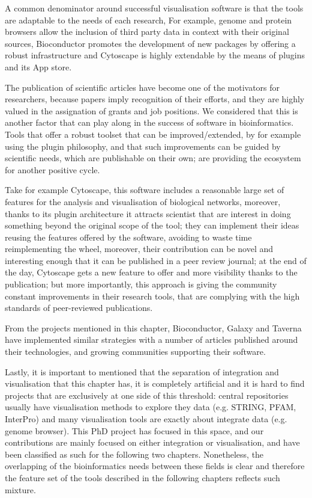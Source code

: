 A common denominator around successful visualisation software is that the tools are adaptable to the needs of each research, For example, genome and protein browsers allow the inclusion of third party data in context with their original sources, Bioconductor promotes the development of new packages by offering a robust infrastructure and Cytoscape is highly extendable by the means of plugins and its App store. 

The publication of scientific articles have become one of the motivators for researchers, because papers imply recognition of their efforts, and they are highly valued in the assignation of grants and job positions. We considered that this is another factor that can play along in the success of software in bioinformatics. Tools that offer a robust toolset that can be improved/extended, by for example using the plugin philosophy, and that such improvements can be guided by scientific needs, which are publishable on their own; are providing the ecosystem for another positive cycle. 

Take for example Cytoscape, this software includes a reasonable large set of features for the analysis and visualisation of biological networks, moreover,  thanks to its plugin architecture it attracts scientist that are interest in doing something beyond the original scope of the tool; they can implement their ideas reusing the features offered by the software, avoiding to waste time reimplementing the wheel, moreover, their contribution can be novel and interesting enough that it can be published in a peer review journal; at the end of the day, Cytoscape gets a new feature to offer and more visibility thanks to the publication; but more importantly, this approach is giving the community constant improvements in their research tools, that are complying with the high standards of peer-reviewed publications. 

From the projects mentioned in this chapter, Bioconductor, Galaxy and Taverna have implemented similar strategies with a number of articles published around their technologies, and growing communities supporting their software.

Lastly, it is important to mentioned that the separation of integration and visualisation that this chapter has, it is completely artificial and it is hard to find projects that are exclusively at one side of this threshold: central repositories usually have visualisation methods to explore they data (e.g. STRING, PFAM, InterPro) and many visualisation tools are exactly about integrate data (e.g. genome browser). This PhD project has focused in this space, and our contributions are mainly focused on either integration or visualisation, and have been classified as such for the following two chapters. Nonetheless, the overlapping of the bioinformatics needs between these fields is clear and therefore the feature set of the tools described in the following chapters reflects such  mixture. 



